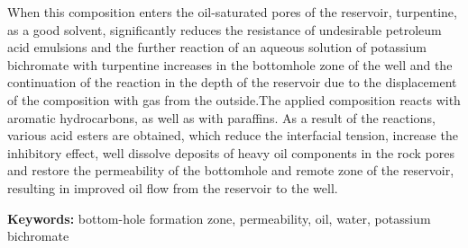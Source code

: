 When this composition enters the oil-saturated pores of the reservoir,
turpentine, as a good solvent, significantly reduces the resistance of
undesirable petroleum acid emulsions and the further reaction of an
aqueous solution of potassium bichromate with turpentine increases in
the bottomhole zone of the well and the continuation of the reaction in
the depth of the reservoir due to the displacement of the composition
with gas from the outside.The applied composition reacts with aromatic
hydrocarbons, as well as with paraffins. As a result of the reactions,
various acid esters are obtained, which reduce the interfacial tension,
increase the inhibitory effect, well dissolve deposits of heavy oil
components in the rock pores and restore the permeability of the
bottomhole and remote zone of the reservoir, resulting in improved oil
flow from the reservoir to the well.

{\bfseries Keywords:} bottom-hole formation zone, permeability, oil, water,
potassium bichromate

